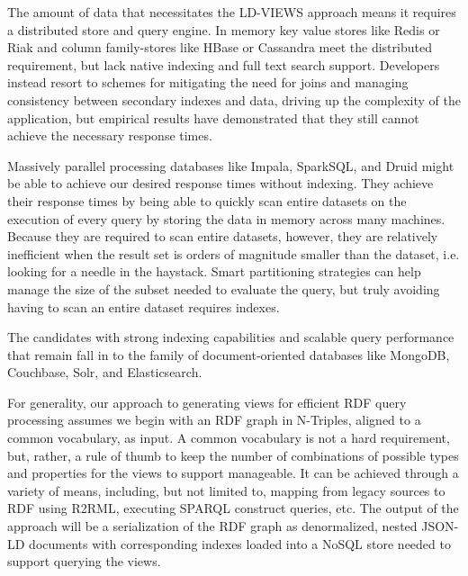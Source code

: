 The amount of data that necessitates the LD-VIEWS approach means it requires a distributed store and query engine.   
In memory key value stores like Redis or Riak and column family-stores like HBase or Cassandra meet the distributed requirement, but lack native indexing and full text search support.  
Developers instead resort to schemes for mitigating the need for joins and managing consistency between secondary indexes and data, driving up the complexity of the application, but empirical results have demonstrated that they still cannot achieve the necessary response times.   

Massively parallel processing databases like Impala, SparkSQL, and Druid might be able to achieve our desired response times without indexing. 
They achieve their response times by being able to quickly scan entire datasets on the execution of every query by storing the data in memory across many machines.  
Because they are required to scan entire datasets, however, they are relatively inefficient when the result set is orders of magnitude smaller than the dataset, i.e. looking for a needle in the haystack.  
Smart partitioning strategies can help manage the size of the subset needed to evaluate the query, but truly avoiding having to scan an entire dataset requires indexes. 

The candidates with strong indexing capabilities and scalable query performance that remain fall in to the family of document-oriented databases like MongoDB, Couchbase, Solr, and Elasticsearch.  



For generality, our approach to generating views for efficient RDF query processing assumes we begin with an RDF graph in N-Triples, aligned to a common vocabulary, as input.  
A common vocabulary is not a hard requirement, but, rather, a rule of thumb to keep the number of combinations of possible types and properties for the views to support manageable.
It can be achieved through a variety of means, including, but not limited to, mapping from legacy sources to RDF using R2RML, executing SPARQL construct queries, etc. 
The output of the approach will be a serialization of the RDF graph as denormalized, nested JSON-LD documents with corresponding indexes loaded into a NoSQL store needed to support querying the views. 

